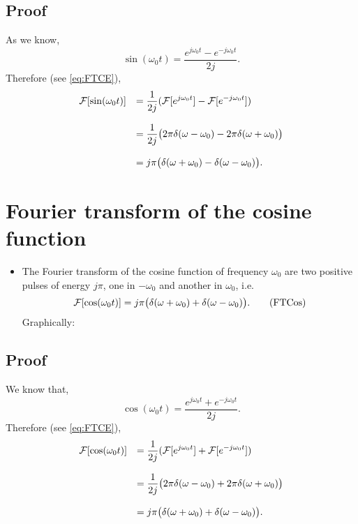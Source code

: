 \subsection*{Proof}
\noindent As we know,
\begin{equation*}
  \sin(\omega_0t) = \frac{\displaystyle e^{j\omega_0t}-e^{-j\omega_0t}}{\displaystyle 2j}.
\end{equation*}
Therefore (see \ref{eq:FTCE}),
\begin{equation*}
  \begin{array}{rl}
    {\cal F}[\sin(\omega_0t)] & = \displaystyle\frac{1}{2j}({\cal
      F}[e^{j\omega_0t}]-{\cal F}[e^{-j\omega_0t}])\\\\
    & = \displaystyle\frac{1}{2j}\big(2\pi\delta(\omega-\omega_0)-2\pi\delta(\omega+\omega_0)\big)\\\\
    & = j\pi\big(\delta(\omega+\omega_0)-\delta(\omega-\omega_0)\big).
  \end{array}
\end{equation*}

\section{Fourier transform of the cosine function}
\begin{itemize}
\item The Fourier transform of the cosine function of frequency $\omega_0$
  are two positive pulses of energy $j\pi$, one in $-\omega_0$ and another
  in $\omega_0$, i.e.
  \begin{equation}
    {\cal F}[\cos(\omega_0t)] = j\pi\big(\delta(\omega+\omega_0)+\delta(\omega-\omega_0)\big).
    \tag{FTCos}
    \label{eq:FtCos}
  \end{equation}
  Graphically:
\end{itemize}

\subsection*{Proof}
\noindent We know that,
\begin{equation}
  \cos(\omega_0t) = \frac{\displaystyle e^{j\omega_0t}+e^{-j\omega_0t}}{\displaystyle 2j}.
\end{equation}
Therefore (see \ref{eq:FTCE}),
\begin{equation*}
  \begin{array}{rl}
    {\cal F}[\cos(\omega_0t)] & = \displaystyle\frac{1}{2j}({\cal
      F}[e^{j\omega_0t}]+{\cal F}[e^{-j\omega_0t}])\\\\
    & = \displaystyle\frac{1}{2j}\big(2\pi\delta(\omega-\omega_0)+2\pi\delta(\omega+\omega_0)\big)\\\\
    & = j\pi\big(\delta(\omega+\omega_0)+\delta(\omega-\omega_0)\big).
  \end{array}
\end{equation*}

